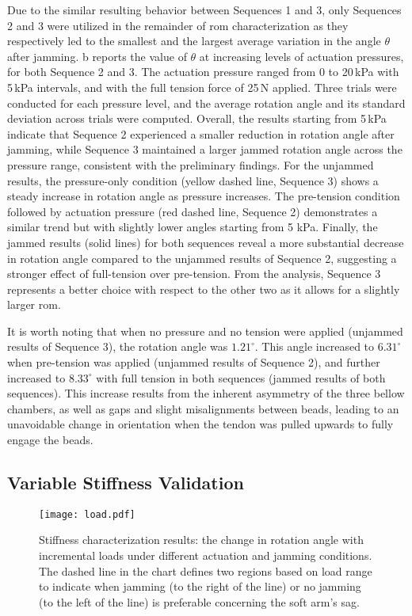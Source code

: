 Due to the similar resulting behavior between Sequences 1 and 3, only Sequences 2 and 3 were utilized in the remainder of \gls{rom} characterization as they respectively led to the smallest and the largest average variation in the angle $\theta$ after jamming. b reports the value of $\theta$ at increasing levels of actuation pressures, for both Sequence 2 and 3.
The actuation pressure ranged from $0$ to 20\,kPa with 5\,kPa intervals, and with the full tension force of 25\,N applied. Three trials were conducted for each pressure level, and the average rotation angle and its standard deviation across trials were computed. Overall, the results starting from 5\,kPa indicate that Sequence 2 experienced a smaller reduction in rotation angle after jamming, while Sequence 3 maintained a larger jammed rotation angle across the pressure range, consistent with the preliminary findings. For the unjammed results, the pressure-only condition (yellow dashed line, Sequence 3) shows a steady increase in rotation angle as pressure increases. The pre-tension condition followed by actuation pressure (red dashed line, Sequence 2) demonstrates a similar trend but with slightly lower angles starting from 5 kPa. Finally, the jammed results (solid lines) for both sequences reveal a more substantial decrease in rotation angle compared to the unjammed results of Sequence 2, suggesting a stronger effect of full-tension over pre-tension. From the analysis, Sequence 3 represents a better choice with respect to the other two as it allows for a slightly larger \gls{rom}.

It is worth noting that when no pressure and no tension were applied (unjammed results of Sequence 3), the rotation angle was $1.21^{\circ}$. This angle increased to $6.31^{\circ}$ when pre-tension was applied (unjammed results of Sequence 2), and further increased to $8.33^{\circ}$ with full tension in both sequences (jammed results of both sequences). This increase results from the inherent asymmetry of the three bellow chambers, as well as gaps and slight misalignments between beads, leading to an unavoidable change in orientation when the tendon was pulled upwards to fully engage the beads. 

\subsection{Variable Stiffness Validation}

\begin{figure}[t]
    \centering
    \texttt{[image: load.pdf]}
    \caption{Stiffness characterization results: the change in rotation angle with incremental loads under different actuation and jamming conditions. The dashed line in the chart defines two regions based on load range to indicate when jamming (to the right of the line) or no jamming (to the left of the line) is preferable concerning the soft arm’s sag.}
    \label{fig:stiffness}
    \vspace{-1.2em}
\end{figure}

